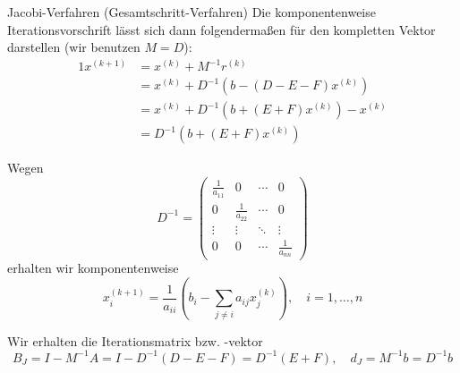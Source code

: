 \begin{defi}{Jacobi-Verfahren (Gesamtschritt-Verfahren)}
    Die komponentenweise Iterationsvorschrift lässt sich dann folgendermaßen für den kompletten Vektor darstellen (wir benutzen $M = D$):
    \begin{alignat*}{1}
        x^{(k+1)} & = x^{(k)} + M^{-1} r^{(k)}                                                   \\
                  & = x^{(k)} + D^{-1} \left( b - (D - E - F) x^{(k)} \right)                    \\
                  & = x^{(k)} + D^{-1} \left( b + \left( E + F \right) x^{(k)} \right) - x^{(k)} \\
                  & = D^{-1} \left( b + (E + F) x^{(k)} \right)
    \end{alignat*}

    Wegen
    \[
        D^{-1} =
        \begin{pmatrix}
            \frac{1}{a_{11}} & 0                & \cdots & 0                \\
            0                & \frac{1}{a_{22}} & \cdots & 0                \\
            \vdots           & \vdots           & \ddots & \vdots           \\
            0                & 0                & \cdots & \frac{1}{a_{nn}}
        \end{pmatrix}
    \]
    erhalten wir komponentenweise
    \[
        x_i^{(k+1)} = \frac{1}{a_{ii}} \left( b_i - \sum_{j \neq i} a_{ij} x_j^{(k)} \right), \quad i = 1, \ldots, n
    \]

    Wir erhalten die Iterationsmatrix bzw. -vektor
    \[
        B_{J} = I - M^{-1} A = I - D^{-1} (D - E - F) = D^{-1} (E + F), \quad d_{J} = M^{-1} b = D^{-1} b
    \]
\end{defi}


